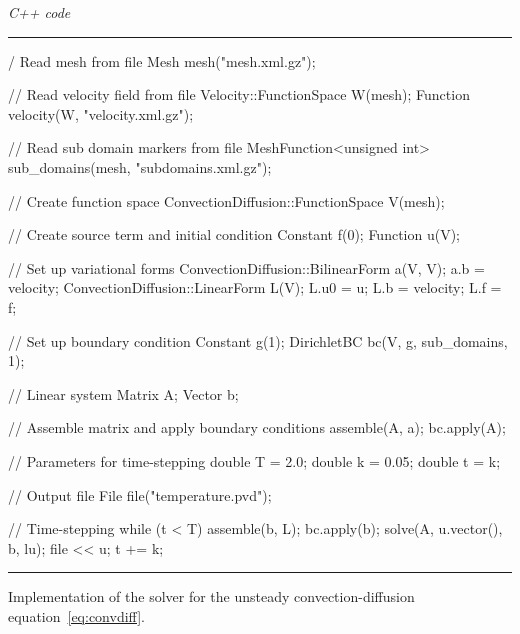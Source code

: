 \documentclass[acmtoms]{acmtrans2m}
\newenvironment{cppcode}[1]{\center\minipage{#1\textwidth}\footnotesize\hfill\it C++ code \rm\vspace{0.1cm}\hrule\renewcommand{\baselinestretch}{0.9}\footnotesize\verbatim}{\endverbatim\hrule\normalsize\endminipage\newline\endcenter}
\begin{document}
\begin{table}
\begin{cppcode}{0.9}
// Read mesh from file
Mesh mesh("mesh.xml.gz");

// Read velocity field from file
Velocity::FunctionSpace W(mesh);
Function velocity(W, "velocity.xml.gz");

// Read sub domain markers from file
MeshFunction<unsigned int> sub_domains(mesh, "subdomains.xml.gz");

// Create function space
ConvectionDiffusion::FunctionSpace V(mesh);

// Create source term and initial condition
Constant f(0);
Function u(V);

// Set up variational forms
ConvectionDiffusion::BilinearForm a(V, V);
a.b = velocity;
ConvectionDiffusion::LinearForm L(V);
L.u0 = u; L.b = velocity; L.f = f;

// Set up boundary condition
Constant g(1);
DirichletBC bc(V, g, sub_domains, 1);

// Linear system
Matrix A;
Vector b;

// Assemble matrix and apply boundary conditions
assemble(A, a);
bc.apply(A);

// Parameters for time-stepping
double T = 2.0; double k = 0.05; double t = k;

// Output file
File file("temperature.pvd");

// Time-stepping
while (t < T)
{
  assemble(b, L);
  bc.apply(b);
  solve(A, u.vector(), b, lu);
  file << u;
  t += k;
}
\end{cppcode}
\caption{Implementation of the solver for the unsteady
convection-diffusion equation~\eqref{eq:convdiff}.}
\label{code:convdiff,dolfin}
\end{table}
\end{document}
